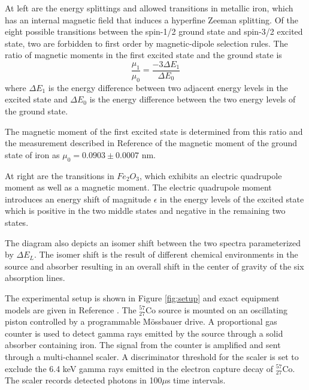 At left are the energy splittings and allowed transitions in metallic iron, which has an internal magnetic field that induces a hyperfine Zeeman splitting. Of the eight possible transitions between the spin-1/2 ground state and spin-3/2 excited state, two are forbidden to first order by magnetic-dipole selection rules. The ratio of magnetic moments in the first excited state and the ground state is 
\begin{equation}
\frac{\mu_1}{\mu_0} = \frac{-3\Delta E_1}{\Delta E_0}
\label{eq:mag}
\end{equation}
where $\Delta E_1$ is the energy difference between two adjacent energy levels in the excited state and $\Delta E_0$ is the energy difference between the two energy levels of the ground state.

The magnetic moment of the first excited state is determined from this ratio and the measurement described in Reference \cite{ludwig} of the magnetic moment of the ground state of iron as $\mu_0=0.0903\pm0.0007$ nm. 

At right are the transitions in $Fe_2O_3$, which exhibits an electric quadrupole moment as well as a magnetic moment. The electric quadrupole moment introduces an energy shift of magnitude $\epsilon$ in the energy levels of the excited state which is positive in the two middle states and negative in the remaining two states.

The diagram also depicts an isomer shift between the two spectra parameterized by $\Delta E_L$. The isomer shift is the result of different chemical environments in the source and absorber resulting in an overall shift in the center of gravity of the six absorption lines. 

The experimental setup is shown in Figure \ref{fig:setup} and exact equipment models are given in Reference \cite{lab}. The $^{57}_{27}$Co source is mounted on an oscillating piston controlled by a programmable M{\"o}ssbauer drive. A proportional gas counter is used to detect gamma rays emitted by the source through a solid absorber containing iron. The signal from the counter is amplified and sent through a multi-channel scaler. A discriminator threshold for the scaler is set to exclude the 6.4 keV gamma rays emitted in the electron capture decay of $^{57}_{27}$Co. The scaler records detected photons in 100$\mu$s time intervals. 

